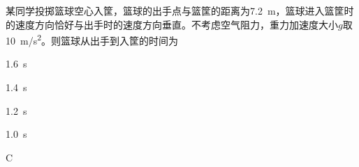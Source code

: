 某同学投掷篮球空心入筐，篮球的出手点与篮筐的距离为\qty{7.2}{m}，篮球进入篮筐时的速度方向恰好与出手时的速度方向垂直。不考虑空气阻力，重力加速度大小\(g\)取\qty{10}{m/s^2}。则篮球从出手到入筐的时间为\paren[]
\begin{choices}
	\item \qty{1.6}{s}
	\item \qty{1.4}{s}
	\item \qty{1.2}{s}
	\item \qty{1.0}{s}
\end{choices}
\begin{answer}
	C
\end{answer}